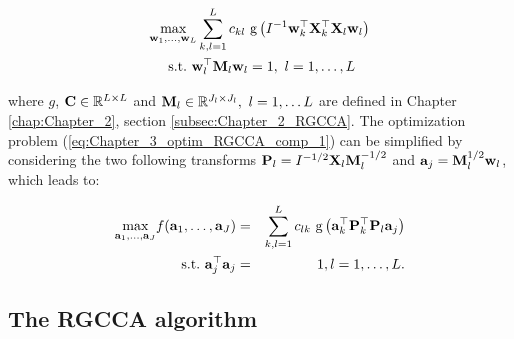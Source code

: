 \documentclass[
]{jss}
\begin{document}
\begin{equation}
    \begin{gathered}
        \underset{\mathbf{w}_1, \ldots,\mathbf{w}_L}{\text{max}} \sum_{\substack{k, l = 1}}^L c_{kl} \text{ g}\left(I^{-1}\mathbf{w}_k^\top \mathbf{X}_k ^\top \mathbf{X}_l \mathbf{w}_l \right)
        \\
        \text{~s.t.~} \mathbf{w}_l^\top\mathbf{M}_l\mathbf{w}_l = 1,~ l = 1, \ldots, L
    \label{eq:Chapter_3_optim_RGCCA_comp_1}
    \end{gathered}
\end{equation}

where \(g\), \(\mathbf{C}\in\mathbb{R}^{L\times L}\) and
\(\mathbf{M}_l\in\mathbb{R}^{J_l\times J_l}, ~l=1, \ldots L\) are defined in
Chapter \ref{chap:Chapter_2}, section \ref{subsec:Chapter_2_RGCCA}. The
optimization problem (\ref{eq:Chapter_3_optim_RGCCA_comp_1}) can be
simplified by considering the two following transforms
\(\mathbf{P}_l = I^{-1/2}\mathbf{X}_l\mathbf{M}_l^{-1/2}\) and
\(\mathbf{a}_j = \mathbf{M}_l^{1/2}\mathbf{w}_l\), which leads to:

\begin{eqnarray}
    \displaystyle \underset{\mathbf{a}_1, \ldots,\mathbf{a}_J}{\text{max}} f(\mathbf{a}_1, \ldots, \mathbf{a}_J) &=& \sum_{\substack{k, l = 1}}^L c_{lk} \text{ g}\left(\mathbf{a}_k^\top \mathbf{P}_k^\top \mathbf{P}_l \mathbf{a}_j \right) \label{eq:Chapter_3_optim_RGCCA_one_comp_VARCHANGED}\\
    \text{~s.t.~} \mathbf{a}_j^\top\mathbf{a}_j &=& 1 , l = 1, \ldots, L \label{eq:Chapter_3_optim_RGCCA_one_comp_VARCHANGED_constr}.
\end{eqnarray}

\hypertarget{the-rgcca-algorithm}{%
\subsection{The RGCCA algorithm}\label{the-rgcca-algorithm}}
\end{document}
